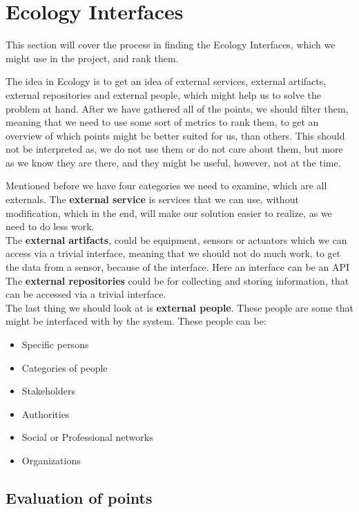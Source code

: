\section{Ecology Interfaces}
This section will cover the process in finding the Ecology Interfaces, which we might use in the project, and rank them.

The idea in Ecology is to get an idea of external services, external artifacts, external repositories and external people, which might help us to solve the problem at hand.
After we have gathered all of the points, we should filter them, meaning that we need to use some sort of metrics to rank them, to get an overview of which points might be better suited for us, than others.
This should not be interpreted as, we do not use them or do not care about them, but more as we know they are there, and they might be useful, however, not at the time.

Mentioned before we have four categories we need to examine, which are all externals.
The \textbf{external service} is services that we can use, without modification, which in the end, will make our solution easier to realize, as we need to do less work.\\
The \textbf{external artifacts}, could be equipment, sensors or actuators which we can access via a trivial interface, meaning that we should not do much work, to get the data from a sensor, because of the interface.
Here an interface can be an API\\
The \textbf{external repositories} could be for collecting and storing information, that can be accessed via a trivial interface.\\
The last thing we should look at is \textbf{external people}.
These people are some that might be interfaced with by the system.
These people can be:

\begin{itemize}
    \item Specific persons
    \item Categories of people
    \item Stakeholders
    \item Authorities
    \item Social or Professional networks
    \item Organizations
\end{itemize}

\subsection{Evaluation of points}

